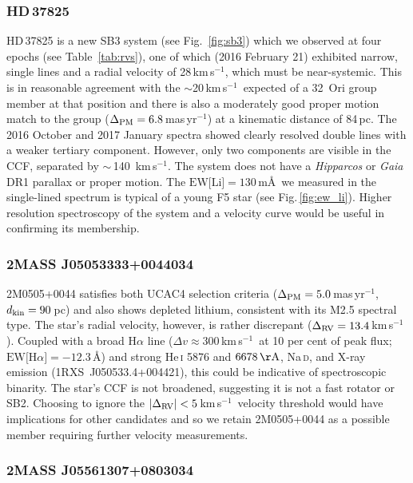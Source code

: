 \documentclass[usenatbib]{mnras}
\newcommand{\masyr}{mas\,yr$^{-1}$}
\newcommand{\kms}{\textrm{km\,s$^{-1}$}}
\begin{document}
\subsubsection{HD\,37825}

HD\,37825 is a new SB3 system (see Fig.~\ref{fig:sb3}) which we
observed at four epochs (see Table~\ref{tab:rvs}), one of which (2016
February 21) exhibited narrow, single lines and a radial velocity of
28\,\kms, which must be near-systemic. This is in reasonable agreement with the $\sim$20\,\kms\ expected of a
32~Ori group member at that position and there is also a moderately good
proper motion match to the group ($\Delta_{\rm PM}=6.8$\,\masyr) at a
kinematic distance of 84\,pc. The 2016 October and 2017 January spectra showed clearly resolved double lines with a weaker tertiary component. However, only two components are visible in the CCF, separated by $\sim$\,140~\kms. The system does not have a
\emph{Hipparcos} or \emph{Gaia} DR1 parallax or proper motion. The
$\textrm{EW[Li]}=130$\,m\AA\ we measured in the single-lined spectrum
is typical of a young F5 star (see Fig.\,\ref{fig:ew_li}). Higher resolution spectroscopy of the system and a velocity curve would be useful in confirming its membership.

\subsubsection{2MASS J05053333+0044034}
\label{2massj0505+0044}

2M0505+0044 satisfies both UCAC4 selection criteria
($\Delta_{\rm{PM}}=5.0$\,\masyr, $d_{\rm{kin}}=90$\,pc) and also shows
depleted lithium, consistent with its M2.5 spectral type. The star's
radial velocity, however, is rather discrepant
($\Delta_{\rm{RV}}=13.4$\,\kms). Coupled with a broad H$\alpha$ line
($\Delta v\approx 300$\,\kms\ at 10 per cent of peak flux;
$\textrm{EW[H$\alpha$]}=-12.3$\,\AA) and strong He\,\textsc{i} 5876 and
$6678\,\rm{\AA}$, Na\,\textsc{d}, and X-ray emission
(1RXS~J050533.4+004421), this could be indicative of spectroscopic
binarity. The star's CCF is not broadened, suggesting it is not a fast
rotator or SB2. Choosing to ignore the
$|\Delta_{\rm{RV}}|<5$\,\kms\ velocity threshold would have
implications for other candidates and so we retain 2M0505+0044 as a
possible member requiring further velocity measurements.

\subsubsection{2MASS J05561307+0803034}
\label{2massj0556+0803}
\end{document}
